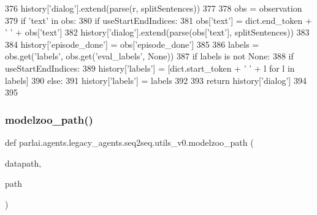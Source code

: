\begin{DoxyCode}
376             history[\textcolor{stringliteral}{'dialog'}].extend(parse(r, splitSentences))
377 
378     obs = observation
379     \textcolor{keywordflow}{if} \textcolor{stringliteral}{'text'} \textcolor{keywordflow}{in} obs:
380         \textcolor{keywordflow}{if} useStartEndIndices:
381             obs[\textcolor{stringliteral}{'text'}] = dict.end\_token + \textcolor{stringliteral}{' '} + obs[\textcolor{stringliteral}{'text'}]
382         history[\textcolor{stringliteral}{'dialog'}].extend(parse(obs[\textcolor{stringliteral}{'text'}], splitSentences))
383 
384     history[\textcolor{stringliteral}{'episode\_done'}] = obs[\textcolor{stringliteral}{'episode\_done'}]
385 
386     labels = obs.get(\textcolor{stringliteral}{'labels'}, obs.get(\textcolor{stringliteral}{'eval\_labels'}, \textcolor{keywordtype}{None}))
387     \textcolor{keywordflow}{if} labels \textcolor{keywordflow}{is} \textcolor{keywordflow}{not} \textcolor{keywordtype}{None}:
388         \textcolor{keywordflow}{if} useStartEndIndices:
389             history[\textcolor{stringliteral}{'labels'}] = [dict.start\_token + \textcolor{stringliteral}{' '} + l \textcolor{keywordflow}{for} l \textcolor{keywordflow}{in} labels]
390         \textcolor{keywordflow}{else}:
391             history[\textcolor{stringliteral}{'labels'}] = labels
392 
393     \textcolor{keywordflow}{return} history[\textcolor{stringliteral}{'dialog'}]
394 
395 
\end{DoxyCode}
\mbox{\label{namespaceparlai_1_1agents_1_1legacy__agents_1_1seq2seq_1_1utils__v0_a5fbd3301b67f00d6d146fb01c7cd7626}} 
\subsubsection{\texorpdfstring{modelzoo\+\_\+path()}{modelzoo\_path()}}
{\footnotesize\ttfamily def parlai.\+agents.\+legacy\+\_\+agents.\+seq2seq.\+utils\+\_\+v0.\+modelzoo\+\_\+path (\begin{DoxyParamCaption}\item[{}]{datapath,  }\item[{}]{path }\end{DoxyParamCaption})}

